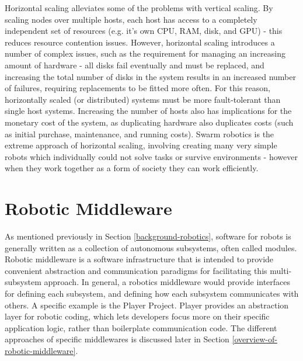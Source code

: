 \documentclass[../dissertation.tex]{subfiles}
\begin{document}
Horizontal scaling alleviates some of the problems with vertical scaling. By scaling nodes over multiple hosts, each host has access to a completely independent set of resources (e.g. it's own CPU, RAM, disk, and GPU) - this reduces resource contention issues. However, horizontal scaling introduces a number of complex issues, such as the requirement for managing an increasing amount of hardware - all disks fail eventually and must be replaced, and increasing the total number of disks in the system results in an increased number of failures, requiring replacements to be fitted more often. For this reason, horizontally scaled (or distributed) systems must be more fault-tolerant than single host systems. Increasing the number of hosts also has implications for the monetary cost of the system, as duplicating hardware also duplicates costs (such as initial purchase, maintenance, and running costs). Swarm robotics is the extreme approach of horizontal scaling, involving creating many very simple robots which individually could not solve tasks or survive environments - however when they work together as a form of society they can work efficiently\cite{csahin2004swarm}.

\section{Robotic Middleware}
\label{robotic-middleware}

As mentioned previously in Section \ref{background-robotics}, software for robots is generally written as a collection of autonomous subsystems, often called modules. Robotic middleware is a software infrastructure that is intended to provide convenient abstraction and communication paradigms for facilitating this multi-subsystem approach. In general, a robotics middleware would provide interfaces for defining each subsystem, and defining how each subsystem communicates with others. A specific example is the Player Project. Player provides an abstraction layer for robotic coding, which lets developers focus more on their specific application logic, rather than boilerplate communication code\cite{vaughan2003device}. The different approaches of specific middlewares is discussed later in Section \ref{overview-of-robotic-middleware}.
\end{document}
